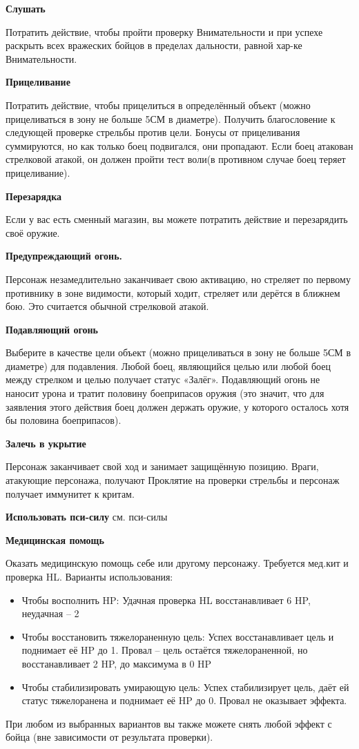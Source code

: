 \begin{multicols}{2}
    \textbf{Слушать}

    Потратить действие, чтобы пройти проверку Внимательности и при успехе раскрыть всех вражеских бойцов в пределах дальности, 
    равной хар-ке Внимательности.

    \textbf{Прицеливание}

    Потратить действие, чтобы прицелиться в определённый объект (можно прицеливаться в зону не больше 5СМ в диаметре). Получить 
    благословение к следующей проверке стрельбы против цели. Бонусы от прицеливания суммируются, но как только боец подвигался,
    они пропадают. Если боец атакован стрелковой атакой, он должен пройти тест воли(в противном случае боец теряет прицеливание).

    \textbf{Перезарядка}

    Если у вас есть сменный магазин, вы можете потратить действие и перезарядить своё оружие.

    \textbf{Предупреждающий огонь.}

    Персонаж незамедлительно заканчивает свою активацию, но стреляет по первому противнику в зоне видимости, который ходит, стреляет 
    или дерётся в ближнем бою. Это считается обычной стрелковой атакой.

    \textbf{Подавляющий огонь}

    Выберите в качестве цели объект (можно прицеливаться в зону не больше 5СМ в диаметре) для подавления. Любой боец, являющийся целью 
    или любой боец между стрелком и целью получает статус «Залёг». Подавляющий огонь не наносит урона и тратит половину боеприпасов 
    оружия (это значит, что для заявления этого действия боец должен держать оружие, у которого осталось хотя бы половина боеприпасов).

    \textbf{Залечь в укрытие}

    Персонаж заканчивает свой ход и занимает защищённую позицию. Враги, атакующие персонажа, получают Проклятие на проверки стрельбы 
    и персонаж получает иммунитет к критам.

    \textbf{Использовать пси-силу}
    см. пси-силы

    \textbf{Медицинская помощь}

    Оказать медицинскую помощь себе или другому персонажу. Требуется мед.кит и проверка HL. Варианты использования:
    \begin{itemize}
        \item Чтобы восполнить HP: Удачная проверка HL восстанавливает 6 HP, неудачная – 2
        \item Чтобы восстановить тяжелораненную цель: Успех восстанавливает цель и поднимает её HP до 1. 
        Провал – цель остаётся тяжелораненной, но восстанавливает 2 HP, до максимума в 0 HP
        \item Чтобы стабилизировать умирающую цель: Успех стабилизирует цель, даёт ей статус тяжелоранена и поднимает её HP до 0. Провал не оказывает эффекта.
    \end{itemize}
    При любом из выбранных вариантов вы также можете снять любой эффект с бойца (вне зависимости от результата проверки).


\end{multicols}

